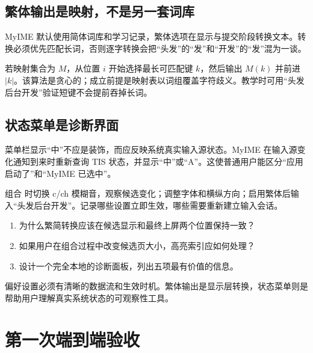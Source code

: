 \section{繁体输出是映射，不是另一套词库}

MyIME 默认使用简体词库和学习记录，繁体选项在显示与提交阶段转换文本。转换必须优先匹配长词，否则逐字转换会把“头发”的“发”和“开发”的“发”混为一谈。



若映射集合为 \(M\)，从位置 \(i\) 开始选择最长可匹配键 \(k\)，然后输出 \(M(k)\) 并前进 \(|k|\)。该算法是贪心的；成立前提是映射表以词组覆盖字符歧义。教学时可用“头发后台开发”验证短键不会提前吞掉长词。

\section{状态菜单是诊断界面}

菜单栏显示“中”不应是装饰，而应反映系统真实输入源状态。MyIME 在输入源变化通知到来时重新查询 TIS 状态，并显示“中”或“A”。这使普通用户能区分“应用启动了”和“MyIME 已选中”。



\begin{lab}[设置即时生效]
组合  时切换 c/ch 模糊音，观察候选变化；调整字体和横纵方向；启用繁体后输入“头发后台开发”。记录哪些设置立即生效，哪些需要重新建立输入会话。
\end{lab}

\exercises
\begin{enumerate}
  \item 为什么繁简转换应该在候选显示和最终上屏两个位置保持一致？
  \item 如果用户在组合过程中改变候选页大小，高亮索引应如何处理？
  \item 设计一个完全本地的诊断面板，列出五项最有价值的信息。
\end{enumerate}

\begin{summarybox}
偏好设置必须有清晰的数据流和生效时机。繁体输出是显示层转换，状态菜单则是帮助用户理解真实系统状态的可观察性工具。
\end{summarybox}


\chapter{第一次端到端验收}

